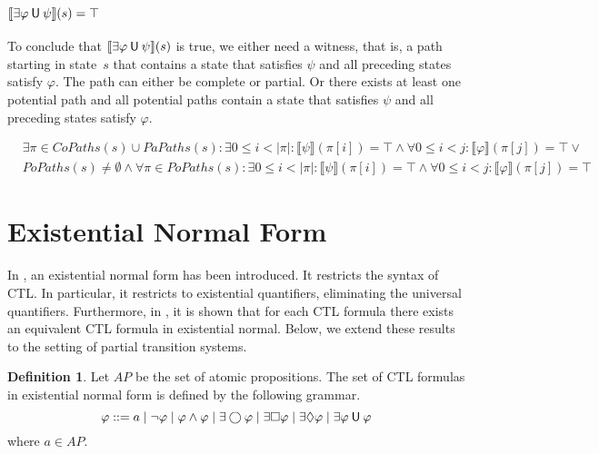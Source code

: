\documentclass[12pt]{article}
\newcommand{\always}{\Box}
\newcommand{\eventually}{\Diamond}
\newcommand{\nxt}{\bigcirc}
\newcommand{\until}{\mathbin{\sf U}}
\theoremstyle{definition}
\newtheorem{definition}{Definition}
\newcommand{\satisfaction}[1]{\llbracket #1 \rrbracket}
\newenvironment{franck}{\color{red}}{\color{black}}
\begin{document}
\begin{franck}
\subsection*{$\satisfaction{\exists \varphi \until \psi}(s) = \top$}

To conclude that $\satisfaction{\exists \varphi \until \psi}(s)$ is true, we either need a witness, that is, a path starting in state~$s$ that contains a state that satisfies $\psi$ and all preceding states satisfy $\varphi$.  The path can either be complete or partial.  Or there exists at least one potential path and all potential paths contain a state that satisfies $\psi$ and all preceding states satisfy $\varphi$.

\begin{align*}
& \exists \pi \in \mathit{CoPaths}(s) \cup \mathit{PaPaths}(s) : \exists 0 \leq i < |\pi| : \satisfaction{\psi}(\pi[i]) = \top \wedge \forall 0 \leq i < j : \satisfaction{\varphi}(\pi[j]) = \top \vee\\
& \mathit{PoPaths}(s) \not= \emptyset \wedge \forall \pi \in \mathit{PoPaths}(s) : \exists 0 \leq i < |\pi| : \satisfaction{\psi}(\pi[i]) = \top \wedge \forall 0 \leq i < j : \satisfaction{\varphi}(\pi[j]) = \top
\end{align*}

\end{franck}

\section{Existential Normal Form}

In \cite[Definition~6.13]{BK08}, an existential normal form has been introduced.  It restricts the syntax of CTL.  In particular, it restricts to existential quantifiers, eliminating the universal quantifiers.  Furthermore, in \cite[Theorem~6.14]{BK08}, it is shown that for each CTL formula there exists an equivalent CTL formula in existential normal.  Below, we extend these results to the setting of partial transition systems.

\begin{definition}
Let $\mathit{AP}$ be the set of atomic propositions.  The set of CTL formulas in existential normal form is defined by the following grammar.
\[
\varphi
::= a
\mid \neg \varphi
\mid \varphi \wedge \varphi
\mid \exists \nxt \varphi
\mid \exists \always \varphi
\mid \exists \eventually \varphi
\mid \exists \varphi \until \varphi
\]
where $a \in \mathit{AP}$.
\end{definition}
\end{document}
